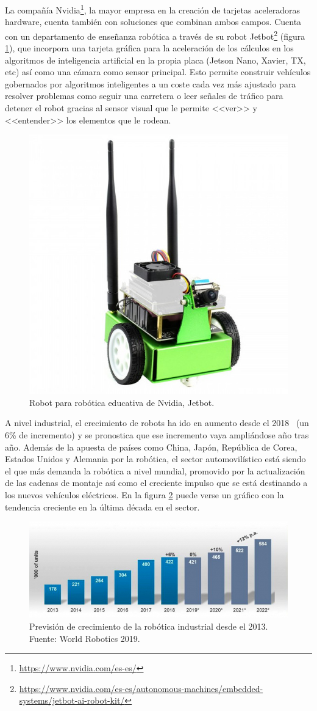 La compañía Nvidia\footnote{\url{https://www.nvidia.com/es-es/}}, la mayor empresa en la creación de tarjetas aceleradoras hardware, cuenta también con soluciones que combinan ambos campos. Cuenta con un departamento de enseñanza robótica a través de su robot Jetbot\footnote{\url{https://www.nvidia.com/es-es/autonomous-machines/embedded-systems/jetbot-ai-robot-kit/}} (figura \ref{fig:jetbot}), que incorpora una tarjeta gráfica para la aceleración de los cálculos en los algoritmos de inteligencia artificial en la propia placa (Jetson Nano, Xavier, TX, etc) así como una cámara como sensor principal. Esto permite construir vehículos gobernados por algoritmos inteligentes a un coste cada vez más ajustado para resolver problemas como seguir una carretera o leer señales de tráfico para detener el robot gracias al sensor visual que le permite <<ver>> y <<entender>> los elementos que le rodean.

\begin{figure}[!ht]
    \centering \includegraphics[width=0.4\columnwidth]{figures/chapter_1/jetbot.jpg}
    \caption{Robot para robótica educativa de Nvidia, Jetbot.}\label{fig:jetbot}
\end{figure}

A nivel industrial, el crecimiento de robots ha ido en aumento desde el 2018~\cite{robotica_industrial} (un 6\% de incremento) y se pronostica que ese incremento vaya ampliándose año tras año. Además de la apuesta de países como China, Japón, República de Corea, Estados Unidos y Alemania por la robótica, el sector automovilístico está siendo el que más demanda la robótica a nivel mundial, promovido por la actualización de las cadenas de montaje así como el creciente impulso que se está destinando a los nuevos vehículos eléctricos. En la figura \ref{fig:crecimiento_robotica_industrial} puede verse un gráfico con la tendencia creciente en la última década en el sector.

\begin{figure}[!ht]
    \centering \includegraphics[width=0.9\columnwidth]{figures/chapter_1/robotica_grafico.jpeg}
    \caption{Previsión de crecimiento de la robótica industrial desde el 2013. Fuente: World Robotics 2019.}\label{fig:crecimiento_robotica_industrial}
\end{figure}

